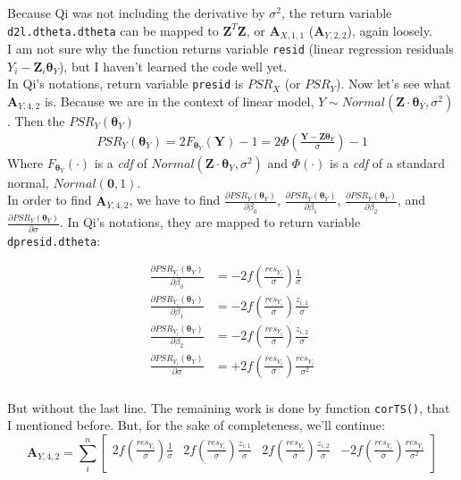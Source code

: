 \documentclass[]{article}
\begin{document}
Because Qi was not including the derivative by $\sigma^2$, the return variable \texttt{d2l.dtheta.dtheta} can be mapped to  $\pmb{Z}^T\pmb{Z}$, or $\pmb{A}_{X,1,1}$ ($\pmb{A}_{Y,2,2}$), again loosely.\\
I am not sure why the function returns variable \texttt{resid} (linear regression residuals $Y_i - \pmb{Z}_i\pmb{\theta}_Y$), but I haven't learned the code well yet.\\

In Qi's notations, return variable \texttt{presid} is $PSR_X$ (or $PSR_Y$). Now let's see what $\pmb{A}_{Y, 4,2}$ is. Because we are in the context of linear model, $Y \sim Normal(\pmb{Z} \cdot \pmb{\theta}_Y , \sigma^2)$. Then the $PSR_Y(\pmb{\theta}_Y)$
  $$
  \begin{aligned}
    PSR_Y(\pmb{\theta}_Y) = 2F_{\pmb{\theta}_Y}(\pmb{Y}) - 1 = 2 \Phi\left(\frac{\pmb{Y} - \pmb{Z}\pmb{\theta}_Y}{\sigma}\right) - 1
  \end{aligned}
  $$
Where $F_{\pmb{\theta}_Y}(\cdot)$ is a \emph{cdf} of $Normal(\pmb{Z} \cdot \pmb{\theta}_Y , \sigma^2)$ and $\Phi(\cdot)$ is a \emph{cdf} of a standard normal, $Normal(\pmb{0}, 1)$.\\

In order to find $\pmb{A}_{Y, 4,2}$, we have to find  $\frac{\partial PSR_Y(\pmb{\theta}_Y)}{\partial \beta_0}$, $\frac{\partial PSR_Y(\pmb{\theta}_Y)}{\partial \beta_1}$, $\frac{\partial PSR_Y(\pmb{\theta}_Y)}{\partial \beta_2}$, and $ \frac{\partial PSR_Y(\pmb{\theta}_Y)}{\partial \sigma}$. In Qi's notations, they are mapped to return variable \texttt{dpresid.dtheta}:

  $$
  \begin{aligned}
    \frac{\partial PSR_{Y_i}(\pmb{\theta}_Y)}{\partial \beta_0} &= -2f\left(\frac{res_{Y_i}}{\sigma}\right)\frac{1}{\sigma}\\
    \frac{\partial PSR_{Y_i}(\pmb{\theta}_Y)}{\partial \beta_1} &= -2f\left(\frac{res_{Y_i}}{\sigma}\right)\frac{z_{i,1}}{\sigma}\\
    \frac{\partial PSR_{Y_i}(\pmb{\theta}_Y)}{\partial \beta_2} &= -2f\left(\frac{res_{Y_i}}{\sigma}\right)\frac{z_{i,2}}{\sigma}\\
    \frac{\partial PSR_{Y_i}(\pmb{\theta}_Y)}{\partial \sigma} &= +2f\left(\frac{res_{Y_i}}{\sigma}\right)\frac{res_{Y_i}}{\sigma^2}\\
  \end{aligned}
  $$

But without the last line. The remaining work is done by function \texttt{corTS()}, that I mentioned before. But, for the sake of completeness, we'll continue:
\[
\pmb{A}_{Y,4,2} = \sum_i^n\begin{bmatrix}
   2f\left(\frac{res_{Y_i}}{\sigma}\right)\frac{1}{\sigma}   &  2f\left(\frac{res_{Y_i}}{\sigma}\right)\frac{z_{i,1}}{\sigma}   & 2f\left(\frac{res_{Y_i}}{\sigma}\right)\frac{z_{i,2}}{\sigma}  &  -2f\left(\frac{res_{Y_i}}{\sigma}\right)\frac{res_{Y_i}}{\sigma^2}\\
\end{bmatrix}\]
\end{document}
